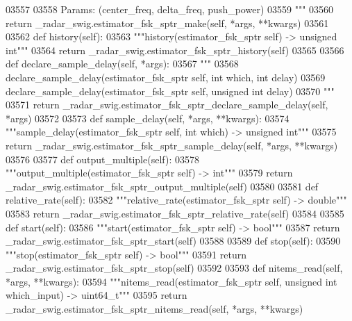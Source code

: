 \begin{DoxyCode}
{{{{{{{{{{{{{03557 \textcolor{stringliteral}{}
03558 \textcolor{stringliteral}{        Params: (center\_freq, delta\_freq, push\_power)}
03559 \textcolor{stringliteral}{        """}
03560         \textcolor{keywordflow}{return} \_radar\_swig.estimator\_fsk\_sptr\_make(self, *args, **kwargs)
03561 
03562     \textcolor{keyword}{def }history(self):
03563         \textcolor{stringliteral}{"""history(estimator\_fsk\_sptr self) -> unsigned int"""}
03564         \textcolor{keywordflow}{return} \_radar\_swig.estimator\_fsk\_sptr\_history(self)
03565 
03566     \textcolor{keyword}{def }declare_sample_delay(self, *args):
03567         \textcolor{stringliteral}{"""}
03568 \textcolor{stringliteral}{        declare\_sample\_delay(estimator\_fsk\_sptr self, int which, int delay)}
03569 \textcolor{stringliteral}{        declare\_sample\_delay(estimator\_fsk\_sptr self, unsigned int delay)}
03570 \textcolor{stringliteral}{        """}
03571         \textcolor{keywordflow}{return} \_radar\_swig.estimator\_fsk\_sptr\_declare\_sample\_delay(self, *args)
03572 
03573     \textcolor{keyword}{def }sample_delay(self, *args, **kwargs):
03574         \textcolor{stringliteral}{"""sample\_delay(estimator\_fsk\_sptr self, int which) -> unsigned int"""}
03575         \textcolor{keywordflow}{return} \_radar\_swig.estimator\_fsk\_sptr\_sample\_delay(self, *args, **kwargs)
03576 
03577     \textcolor{keyword}{def }output_multiple(self):
03578         \textcolor{stringliteral}{"""output\_multiple(estimator\_fsk\_sptr self) -> int"""}
03579         \textcolor{keywordflow}{return} \_radar\_swig.estimator\_fsk\_sptr\_output\_multiple(self)
03580 
03581     \textcolor{keyword}{def }relative_rate(self):
03582         \textcolor{stringliteral}{"""relative\_rate(estimator\_fsk\_sptr self) -> double"""}
03583         \textcolor{keywordflow}{return} \_radar\_swig.estimator\_fsk\_sptr\_relative\_rate(self)
03584 
03585     \textcolor{keyword}{def }start(self):
03586         \textcolor{stringliteral}{"""start(estimator\_fsk\_sptr self) -> bool"""}
03587         \textcolor{keywordflow}{return} \_radar\_swig.estimator\_fsk\_sptr\_start(self)
03588 
03589     \textcolor{keyword}{def }stop(self):
03590         \textcolor{stringliteral}{"""stop(estimator\_fsk\_sptr self) -> bool"""}
03591         \textcolor{keywordflow}{return} \_radar\_swig.estimator\_fsk\_sptr\_stop(self)
03592 
03593     \textcolor{keyword}{def }nitems_read(self, *args, **kwargs):
03594         \textcolor{stringliteral}{"""nitems\_read(estimator\_fsk\_sptr self, unsigned int which\_input) -> uint64\_t"""}
03595         \textcolor{keywordflow}{return} \_radar\_swig.estimator\_fsk\_sptr\_nitems\_read(self, *args, **kwargs)
}}}}}}}}}}}}}
\end{DoxyCode}
